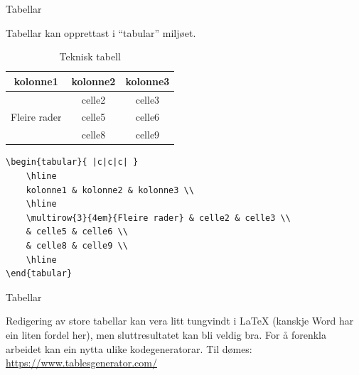 \begin{frame}[containsverbatim]{Tabellar}
	
	Tabellar kan opprettast i ``tabular'' miljøet.
	
	\begin{table}
		\caption{Teknisk tabell}
		\begin{tabular}{ |c|c|c| } 
			\hline
			kolonne1 & kolonne2 & kolonne3 \\
			\hline
			\multirow{3}{4em}{Fleire rader} & celle2 & celle3 \\ 
			& celle5 & celle6 \\ 
			& celle8 & celle9 \\ 
			\hline
		\end{tabular}
	\end{table}
	
	\begin{verbatim}
\begin{tabular}{ |c|c|c| } 
	\hline
	kolonne1 & kolonne2 & kolonne3 \\
	\hline
	\multirow{3}{4em}{Fleire rader} & celle2 & celle3 \\ 
	& celle5 & celle6 \\ 
	& celle8 & celle9 \\ 
	\hline
\end{tabular}
	\end{verbatim}
	
\end{frame}


\begin{frame}{Tabellar}

  Redigering av store tabellar kan vera litt tungvindt i \LaTeX{} (kanskje Word har ein liten fordel her), men sluttresultatet kan bli veldig bra. For å forenkla arbeidet kan ein nytta ulike kodegeneratorar. Til dømes:
  \href{https://www.tablesgenerator.com/}{https://www.tablesgenerator.com/}
  
\end{frame}

%	
%	


